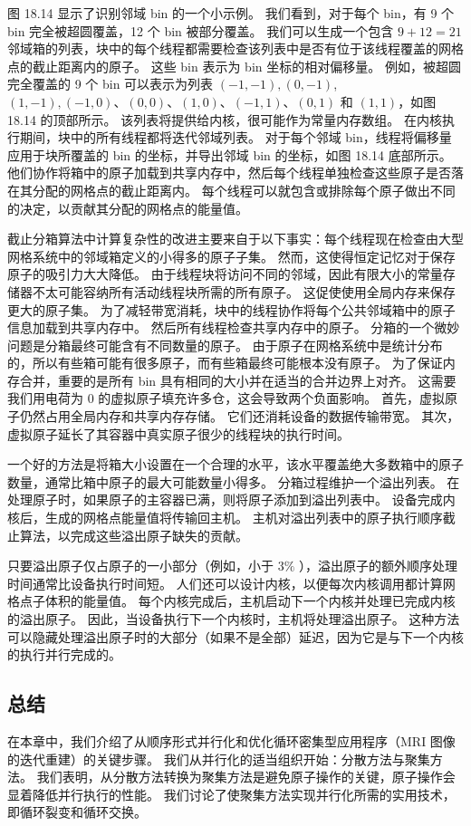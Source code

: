 图 18.14 显示了识别邻域 bin 的一个小示例。 我们看到，对于每个 bin，有 9 个 bin 完全被超圆覆盖，12 个 bin 被部分覆盖。 我们可以生成一个包含 $9+12=21$ 邻域箱的列表，块中的每个线程都需要检查该列表中是否有位于该线程覆盖的网格点的截止距离内的原子。 这些 bin 表示为 bin 坐标的相对偏移量。 例如，被超圆完全覆盖的 9 个 bin 可以表示为列表 $(-1,-1),(0,-1)$, $(1,-1),(-1,0) 、(0,0)、(1,0)、(-1,1)、(0,1)$ 和 $(1,1)$，如图 18.14 的顶部所示。 该列表将提供给内核，很可能作为常量内存数组。 在内核执行期间，块中的所有线程都将迭代邻域列表。 对于每个邻域 bin，线程将偏移量应用于块所覆盖的 bin 的坐标，并导出邻域 bin 的坐标，如图 18.14 底部所示。 他们协作将箱中的原子加载到共享内存中，然后每个线程单独检查这些原子是否落在其分配的网格点的截止距离内。 每个线程可以就包含或排除每个原子做出不同的决定，以贡献其分配的网格点的能量值。

截止分箱算法中计算复杂性的改进主要来自于以下事实：每个线程现在检查由大型网格系统中的邻域箱定义的小得多的原子子集。 然而，这使得恒定记忆对于保存原子的吸引力大大降低。 由于线程块将访问不同的邻域，因此有限大小的常量存储器不太可能容纳所有活动线程块所需的所有原子。 这促使使用全局内存来保存更大的原子集。 为了减轻带宽消耗，块中的线程协作将每个公共邻域箱中的原子信息加载到共享内存中。 然后所有线程检查共享内存中的原子。 分箱的一个微妙问题是分箱最终可能含有不同数量的原子。 由于原子在网格系统中是统计分布的，所以有些箱可能有很多原子，而有些箱最终可能根本没有原子。 为了保证内存合并，重要的是所有 bin 具有相同的大小并在适当的合并边界上对齐。 这需要我们用电荷为 0 的虚拟原子填充许多仓，这会导致两个负面影响。 首先，虚拟原子仍然占用全局内存和共享内存存储。 它们还消耗设备的数据传输带宽。 其次，虚拟原子延长了其容器中真实原子很少的线程块的执行时间。

一个好的方法是将箱大小设置在一个合理的水平，该水平覆盖绝大多数箱中的原子数量，通常比箱中原子的最大可能数量小得多。 分箱过程维护一个溢出列表。 在处理原子时，如果原子的主容器已满，则将原子添加到溢出列表中。 设备完成内核后，生成的网格点能量值将传输回主机。 主机对溢出列表中的原子执行顺序截止算法，以完成这些溢出原子缺失的贡献。

只要溢出原子仅占原子的一小部分（例如，小于 $3 \%$ ），溢出原子的额外顺序处理时间通常比设备执行时间短。 人们还可以设计内核，以便每次内核调用都计算网格点子体积的能量值。 每个内核完成后，主机启动下一个内核并处理已完成内核的溢出原子。 因此，当设备执行下一个内核时，主机将处理溢出原子。 这种方法可以隐藏处理溢出原子时的大部分（如果不是全部）延迟，因为它是与下一个内核的执行并行完成的。

\subsection{总结}
在本章中，我们介绍了从顺序形式并行化和优化循环密集型应用程序（MRI 图像的迭代重建）的关键步骤。 我们从并行化的适当组织开始：分散方法与聚集方法。 我们表明，从分散方法转换为聚集方法是避免原子操作的关键，原子操作会显着降低并行执行的性能。 我们讨论了使聚集方法实现并行化所需的实用技术，即循环裂变和循环交换。

